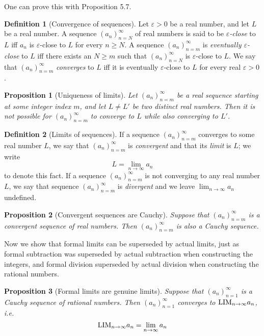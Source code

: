 \documentclass[
]{book}
\newtheorem{proposition}{Proposition}[chapter]
\theoremstyle{definition}
\newtheorem{definition}{Definition}[chapter]
\theoremstyle{definition}
\theoremstyle{definition}
\theoremstyle{definition}
\theoremstyle{remark}
\begin{document}
One can prove this with Proposition 5.7.

\begin{definition}[Convergence of sequences]
Let \(\varepsilon>0\) be a real number, and let \(L\) be a real number. A sequence \((a_n)_{n=N}^{\infty}\) of real numbers is said to be \emph{\(\varepsilon\)-close} to \(L\) iff \(a_n\) is \(\varepsilon\)-close to \(L\) for every \(n\geq N\). A sequence \((a_n)_{n=m}^{\infty}\) is \emph{eventually \(\varepsilon\)-close} to \(L\) iff there exists an \(N\geq m\) such that \((a_n)_{n=N}^{\infty}\) is \(\varepsilon\)-close to \(L\). We say that \((a_n)_{n=m}^{\infty}\) \emph{converges} to \(L\) iff it is eventually \(\varepsilon\)-close to \(L\) for every real \(\varepsilon>0\).
\end{definition}

\begin{proposition}[Uniqueness of limits]
Let \((a_n)_{n=m}^{\infty}\) be a real sequence starting at some integer index \(m\), and let \(L\ne L'\) be two distinct real numbers. Then it is not possible for \((a_n)_{n=m}^{\infty}\) to converge to \(L\) while also converging to \(L'\).
\end{proposition}

\begin{definition}[Limits of sequences]
If a sequence \((a_n)_{n=m}^{\infty}\) converges to some real number \(L\), we say that \((a_n)_{n=m}^{\infty}\) is \emph{convergent} and that its \emph{limit} is \(L\); we write
\[
L= \lim_{n\to\infty}a_n
\]
to denote this fact. If a sequence \((a_n)_{n=m}^{\infty}\) is not converging to any real number \(L\), we say that sequence \((a_n)_{n=m}^{\infty}\) is \emph{divergent} and we leave \(\lim_{n\to\infty}a_n\) undefined.
\end{definition}

\begin{proposition}[Convergent sequences are Cauchy]
Suppose that \((a_n)_{n=m}^{\infty}\) is a convergent sequence of real numbers. Then \((a_n)_{n=m}^{\infty}\) is also a Cauchy sequence.
\end{proposition}

Now we show that formal limits can be superseded by actual limits, just as formal subtraction was superseded by actual subtraction when constructing the integers, and formal division superseded by actual division when constructing the rational numbers.

\begin{proposition}[Formal limits are genuine limits]
\protect\hypertarget{prp:fg}{}\label{prp:fg}Suppose that \((a_n)_{n=1}^{\infty}\) is a Cauchy sequence of rational numbers. Then \((a_n)_{n=1}^{\infty}\) converges to \({\rm LIM}_{n\to \infty}a_n\), i.e.
\[
{\rm LIM}_{n\to \infty}a_n = \lim_{n\to\infty}a_n
\]
\end{proposition}
\end{document}
